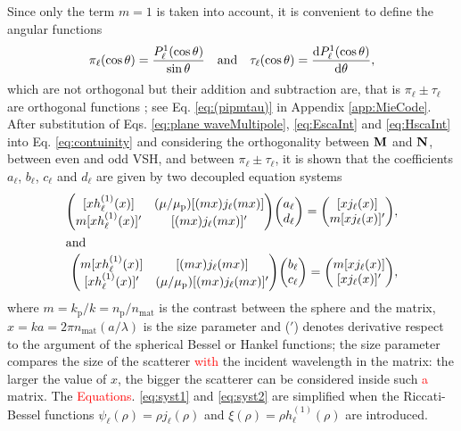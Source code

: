 Since only the term $m=1$ is taken into account, it is convenient to define the angular functions
%
\begin{align}
 \pi_\ell(\cos\theta )  = \frac{P_\ell^1(\cos\theta)}{\sin\theta}\qqtext{and}
 \tau_\ell(\cos\theta) = \dv{P_\ell^1(\cos\theta)}{\theta},
 \label{eq:PiTau}
\end{align}
%
%
which are not orthogonal but their addition and subtraction are, that is $\pi_\ell \pm \tau_\ell$ are orthogonal functions \cite{bohren_absorption_1983}; see Eq. \eqref{eq:(pipmtau)} in Appendix \ref{app:MieCode}. After substitution  of Eqs. \eqref{eq:plane waveMultipole}, \eqref{eq:EscaInt} and \eqref{eq:HscaInt} into Eq. \eqref{eq:contuinity} and considering the orthogonality between $\vb{M}$ and $\vb{N}$,  between even and odd VSH, and between $\pi_\ell \pm \tau_\ell$, it is shown that the coefficients $a_\ell$, $b_\ell$, $c_\ell$ and $d_\ell$ are given by two decoupled equation systems
%
\begin{align}
\mqty([x h_\ell^{(1)}(x)]  & (\mu/\mu_\text{p}) [(mx) j_\ell(mx)] \\
		m[x h_\ell^{(1)}(x)]' & [(mx) j_\ell(mx)]')
		\mqty(a_\ell \\ d_\ell) = \mqty([xj_\ell(x)] \\ m[x j_\ell(x)]') ,
	\label{eq:syst1}
		\\
\intertext{and}
\mqty( m[xh_\ell^{(1)}(x)]  &  [(mx)j_\ell(mx)] \\
		[x h_\ell^{(1)}(x)]' & (\mu/\mu_\text{p})[(mx) j_\ell(mx)]' )
		\mqty(b_\ell \\ c_\ell) = \mqty(m[xj_\ell(x)] \\ [x j_\ell(x)]'),
	\label{eq:syst2}
\end{align}
%
where $m = k_\text{p} / k = n_\text{p} / n_\text{mat}$ is the contrast between the sphere and the matrix, $x= ka = 2\pi n_\text{mat} (a/\lambda)$ is the size parameter and  ($'$) denotes  derivative respect to the argument of the spherical Bessel or Hankel functions; the size parameter compares the size of the scatterer \textcolor{red}{with} the incident wavelength in the matrix: the larger the value of $x$, the bigger the scatterer can be considered inside such \textcolor{red}{a} matrix. The \textcolor{red}{Equations}. \eqref{eq:syst1} and \eqref{eq:syst2} are simplified when the Riccati-Bessel functions $\psi_\ell( \rho) = \rho j_\ell(\rho)$ and $\xi(\rho) = \rho h_\ell^{(1)}(\rho)$ are introduced.

